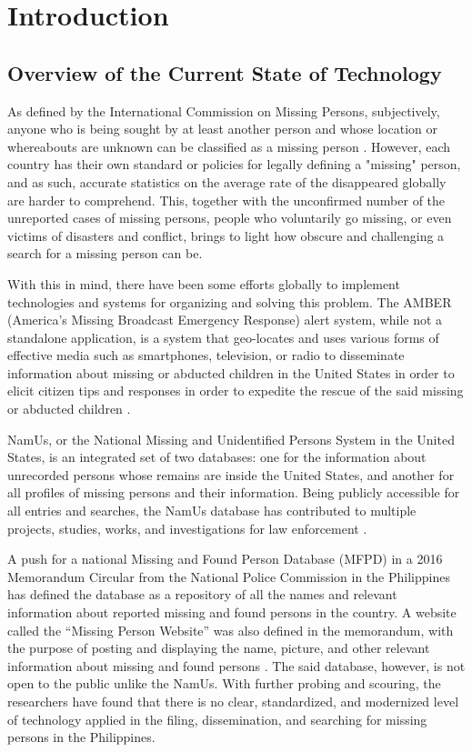 \chapter{Introduction}
\label{sec:researchdesc}    %

\section{Overview of the Current State of Technology}
\label{sec:overview}
As defined by the International Commission on Missing Persons, subjectively, anyone who is being sought by at least another person and whose location or whereabouts are unknown can be classified as a missing person \cite{icmpMissing}. However, each country has their own standard or policies for legally defining a "missing" person, and as such, accurate statistics on the average rate of the disappeared globally are harder to comprehend. This, together with the unconfirmed number of the unreported cases of missing persons, people who voluntarily go missing, or even victims of disasters and conflict, brings to light how obscure and challenging a search for a missing person can be.

With this in mind, there have been some efforts globally to implement technologies and systems for organizing and solving this problem. The AMBER (America's Missing Broadcast Emergency Response) alert system, while not a standalone application, is a system that geo-locates and uses various forms of effective media such as smartphones, television, or radio to disseminate information about missing or abducted children in the United States in order to elicit citizen tips and responses in order to expedite the rescue of the said missing or abducted children \cite{griffin2007preliminary}.

NamUs, or the National Missing and Unidentified Persons System in the United States, is an integrated set of two databases: one for the information about unrecorded persons whose remains are inside the United States, and another for all profiles of missing persons and their information. Being publicly accessible for all entries and searches, the NamUs database has contributed to multiple 
projects, studies, works, and investigations for law enforcement \cite{murray2018history}. 

A push for a national Missing and Found Person Database (MFPD) in a 2016 Memorandum Circular from the National Police Commission in the Philippines has defined the database as a repository of all the names and relevant information about reported missing and found persons in the country. A website called the “Missing Person Website” was also defined in the memorandum, with the purpose of posting and displaying the name, picture, and other relevant information about missing and found persons 
\cite{NationalPoliceCommission}. The said database, however, is not open to the public unlike the NamUs. With further probing and scouring, the researchers have found that there is no clear, standardized, and modernized level of technology applied in the filing, dissemination, and searching for missing persons in the Philippines.


